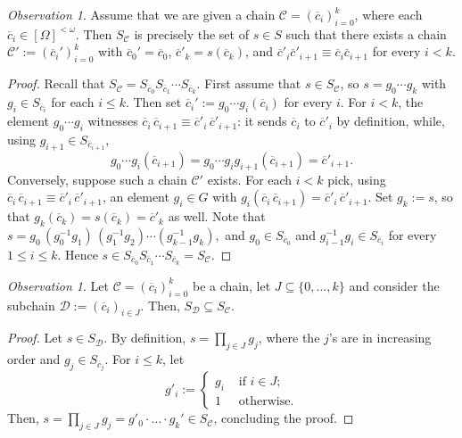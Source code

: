 \documentclass[10pt,a4paper]{amsart}
\newcommand{\nn}[0]{S}
\newcommand{\C}[0]{\mathcal{C}}
\newcommand{\D}[0]{\mathcal{D}}
\newcommand{\fps}[1]{[#1]^{<\omega}}
\newcommand{\orq}[0]{\equiv}
\renewcommand\leq{\leqslant}
\theoremstyle{plain}
\theoremstyle{remark}
\newtheorem{observation}[theorem]{Observation}
\begin{document}
  \begin{observation}
	   \label{o:chain} Assume that we are given a chain $\C=(\overline{c}_{i})_{i=0}^{k}$, where each $\overline{c}_{i}\in\fps{\Omega}$. Then  $\nn_{\mathcal{C}}$ is precisely the set of $s\in S$ such that there exists a chain %
       ${\mathcal{C}'}:=(\overline{c}_{i}')_{i=0}^{k}$ with $\overline{c}_0'=\overline{c}_0$, $\overline{c}'_{k}=s(\overline{c}_{k})$, and $\overline{c}'_{i}\overline{c}'_{i+1}\orq \overline{c}_{i}\overline{c}_{i+1}$ for every $i<k$.  
  \end{observation}
  \begin{proof}
  Recall that $\nn_{\C} = \nn_{\overline{c}_0}\nn_{\overline{c}_1}\cdots\nn_{\overline{c}_k}$. First assume that $s\in \nn_{\C}$, so $s=g_0\cdots g_k$ with $g_i\in \nn_{\overline{c}_i}$ for each %
  {$i\leq k$.}
  Then set $\overline{c}_i':=g_0\cdots g_i(\overline{c}_i)$ for every $i$. 
  For $i < k$, the element $g_0 \cdots g_i$ witnesses
  $\overline{c}_i\,\overline{c}_{i+1} \orq \overline{c}'_i\,\overline{c}'_{i+1}$: it sends
  $\overline{c}_i$ to $\overline{c}'_i$ by definition, while, using $g_{i+1} \in \nn_{\overline{c}_{i+1}}$, \begin{equation*}
    g_0 \cdots g_i(\overline{c}_{i+1})
      = g_0 \cdots g_i g_{i+1}(\overline{c}_{i+1})
      = \overline{c}'_{i+1}.
  \end{equation*}
Conversely, suppose such a chain 
${\mathcal{C}'}$ exists. For each $i < k$ pick,
  using $\overline{c}_i\,\overline{c}_{i+1} \orq \overline{c}'_i\,\overline{c}'_{i+1}$, an element
  {$g_i \in G$}
  with $g_i(\overline{c}_i\,\overline{c}_{i+1}) = \overline{c}'_i\,\overline{c}'_{i+1}$.
  Set $g_k := s$, so that $g_k(\overline{c}_k) = s(\overline{c}_k) = \overline{c}'_k$ as well. Note that $    s = g_0 \,(g_0^{-1}g_1)\,(g_1^{-1}g_2)\cdots(g_{k-1}^{-1}g_k),
$ and  $g_0 \in \nn_{\overline{c}_0}$ and  $g_{i-1}^{-1}g_i\in \nn_{\overline{c}_i}$ for every $1\leq i\leq k$.  Hence
  $s \in \nn_{\overline{c}_0}\nn_{\overline{c}_1}\cdots\nn_{\overline{c}_k} = \nn_{\C}$.
  

  \end{proof}
  
\begin{observation}\label{obs: subchains}
 Let $\C=(\overline{c}_i)_{i=0}^k$ be a chain, let $J\subseteq \{0, \dots, k\}$ and consider the subchain $\D:=(\overline{c}_i)_{i\in J}$. Then, $\nn_{\D}\subseteq\nn_{\C}$.

\end{observation}
\begin{proof} %
Let $s\in\nn_{\D}$. By definition, $s=\prod_{j\in J} g_j$, {where the $j$'s are in increasing order and} %
$g_j\in\nn_{\overline{c}_j}$. For $i\leq k$, let
\[g'_i:=\begin{cases} g_i &\text{ if } i\in J;\\
1 &\text{ otherwise.}
\end{cases}\]
Then, $s=\prod_{j\in J} g_j=g'_0\cdot \dots \cdot g_k'\in \nn_{\C}$,
concluding the proof. 
\end{proof}
\end{document}
